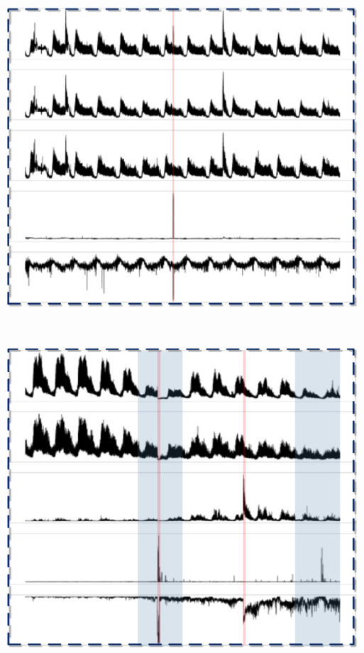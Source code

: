 \documentclass[a0,portrait]{a0poster}
\begin{document}
\begin{multicols}{2}
\begin{center}
\begin{minipage}[c]{0.18\linewidth}
		\label{fig:cdn_kpi_b}
	\end{minipage}
	\begin{minipage}[c]{0.18\linewidth}
		\centering
		\includegraphics[width=\linewidth]{CDN_KPI/cdn_kpi_c}
		\label{fig:cdn_kpi_c}
	\end{minipage}\\
	\begin{minipage}[c]{0.18\linewidth}
		\centering
		\includegraphics[width=\linewidth]{CDN_KPI/cdn_kpi_d}

\end{minipage}
\end{center}
\end{multicols}
\end{document}
